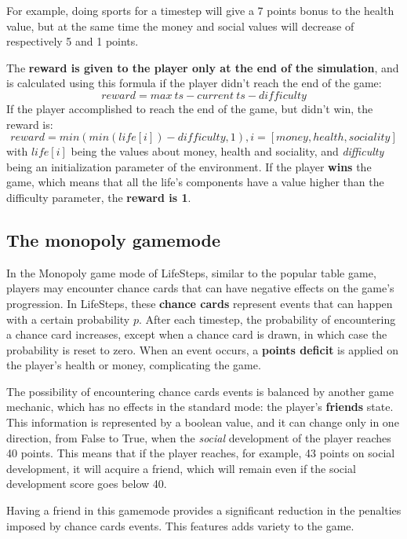 \documentclass{article}
\begin{document}
For example, doing sports for a timestep will give a 7 points bonus to the health value, but at the same time the money and social values will decrease of respectively 5 and 1 points.

The \textbf{reward is given to the player only at the end of the simulation}, and is calculated using this formula if the player didn't reach the end of the game:
\begin{displaymath}
    reward = {max\ ts} - {current\ ts} - {difficulty}
\end{displaymath}
If the player accomplished to reach the end of the game, but didn't win, the reward is:
\begin{displaymath}
    reward = min(min(life[i]) - difficulty, 1), i=[money, health, sociality]
\end{displaymath}
with \(life[i]\) being the values about money, health and sociality, and \textit{difficulty} being an initialization parameter of the environment. If the player \textbf{wins} the game, which means that all the life's components have a value higher than the difficulty parameter, the \textbf{reward is 1}.

\subsection{The monopoly gamemode}

In the Monopoly game mode of LifeSteps, similar to the popular table game, players may encounter chance cards that can have negative effects on the game's progression. In LifeSteps, these \textbf{chance cards} represent events that can happen with a certain probability \(p\). After each timestep, the probability of encountering a chance card increases, except when a chance card is drawn, in which case the probability is reset to zero. When an event occurs, a \textbf{points deficit} is applied on the player's health or money, complicating the game. 

The possibility of encountering chance cards events is balanced by another game mechanic, which has no effects in the standard mode: the player's \textbf{friends} state. This information is represented by a boolean value, and it can change only in one direction, from False to True, when the \textit{social} development of the player reaches 40 points. This means that if the player reaches, for example, 43 points on social development, it will acquire a friend, which will remain even if the social development score goes below 40. 

Having a friend in this gamemode provides a significant reduction in the penalties imposed by chance cards events. This features adds variety to the game.
\end{document}
